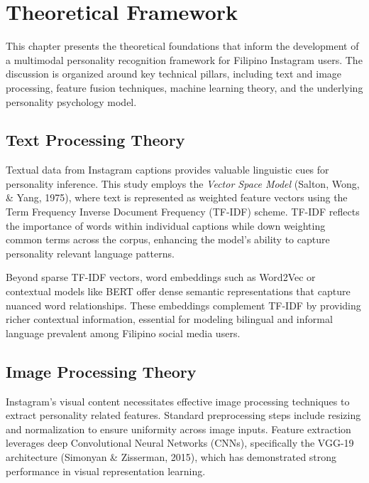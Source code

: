 %
%
%                 

\chapter{Theoretical Framework}
\label{sec:theoframework}

This chapter presents the theoretical foundations that inform the development of a multimodal personality recognition framework for Filipino Instagram users. The discussion is organized around key technical pillars, including text and image processing, feature fusion techniques, machine learning theory, and the underlying personality psychology model.

\section{Text Processing Theory}

Textual data from Instagram captions provides valuable linguistic cues for personality inference. This study employs the \textit{Vector Space Model} (Salton, Wong, \& Yang, 1975), where text is represented as weighted feature vectors using the Term Frequency Inverse Document Frequency (TF-IDF) scheme. TF-IDF reflects the importance of words within individual captions while down weighting common terms across the corpus, enhancing the model's ability to capture personality relevant language patterns.

Beyond sparse TF-IDF vectors, word embeddings such as Word2Vec or contextual models like BERT offer dense semantic representations that capture nuanced word relationships. These embeddings complement TF-IDF by providing richer contextual information, essential for modeling bilingual and informal language prevalent among Filipino social media users.

\section{Image Processing Theory}

Instagram's visual content necessitates effective image processing techniques to extract personality related features. Standard preprocessing steps include resizing and normalization to ensure uniformity across image inputs. Feature extraction leverages deep Convolutional Neural Networks (CNNs), specifically the VGG-19 architecture (Simonyan \& Zisserman, 2015), which has demonstrated strong performance in visual representation learning.

